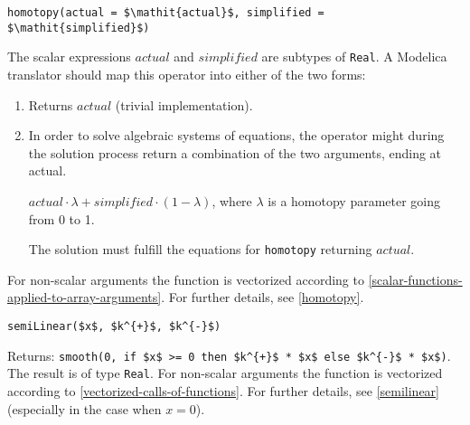 \begin{operatordefinition}[homotopy]
\begin{synopsis}\begin{lstlisting}
homotopy(actual = $\mathit{actual}$, simplified = $\mathit{simplified}$)
\end{lstlisting}\end{synopsis}
\begin{semantics}
The scalar expressions $\mathit{actual}$ and $\mathit{simplified}$ are subtypes of \lstinline!Real!.
A Modelica translator should map this operator into either of the two forms:
\begin{enumerate}
\item
  Returns $\mathit{actual}$ (trivial implementation).
\item
  In order to solve algebraic systems of equations, the operator might during the solution process return a combination of the two arguments, ending at actual.
  \begin{example}
  $\mathit{actual} \cdot \lambda + \mathit{simplified} \cdot (1 - \lambda)$, where $\lambda$ is a homotopy parameter going from 0 to 1.
  \end{example}
  The solution must fulfill the equations for \lstinline!homotopy! returning $\mathit{actual}$.
\end{enumerate}
For non-scalar arguments the function is vectorized according to \cref{scalar-functions-applied-to-array-arguments}.
For further details, see \cref{homotopy}.
\end{semantics}
\end{operatordefinition}

\begin{operatordefinition}[semiLinear]
\begin{synopsis}\begin{lstlisting}
semiLinear($x$, $k^{+}$, $k^{-}$)
\end{lstlisting}\end{synopsis}
\begin{semantics}
Returns: \lstinline!smooth(0, if $x$ >= 0 then $k^{+}$ * $x$ else $k^{-}$ * $x$)!.
The result is of type \lstinline!Real!.
For non-scalar arguments the function is vectorized according to \cref{vectorized-calls-of-functions}.
For further details, see \cref{semilinear} (especially in the case when $x = 0$).
\end{semantics}
\end{operatordefinition}

